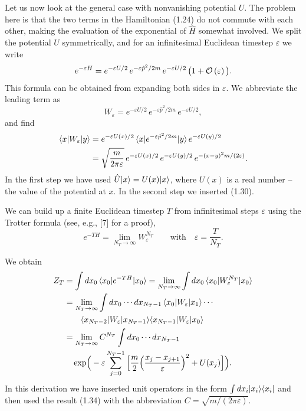 Let us now look at the general case with nonvanishing potential $U$. The
problem here is that the two terms in the Hamiltonian (1.24) do not commute
with each other, making the evaluation of the exponential of $\hat{H}$
somewhat involved. We split the potential $U$ symmetrically, and for an
infinitesimal Euclidean timestep $\varepsilon$ we write
\begin{equation}
  e^{-\varepsilon H} = e^{-\varepsilon U/2}\,e^{-\varepsilon\hat{p}^2/2m}\,
  e^{-\varepsilon U/2}\,\big(1 + \mathcal{O}\left(\varepsilon\right)\big).
\end{equation}
This formula can be obtained from expanding both sides in $\varepsilon$. We
abbreviate the leading term as
\begin{equation}
  W_\varepsilon = e^{-\varepsilon U/2}\,e^{-\varepsilon\hat{p}^2/2m}\,
  e^{-\varepsilon U/2},
\end{equation}
and find
\begin{equation}
  \begin{split}
    \langle x|W_\varepsilon|y\rangle
    &= e^{-\varepsilon U(x)/2}\,\langle x|e^{-\varepsilon\hat{p}^2/2m}|y\rangle\,
       e^{-\varepsilon U(y)/2}\\
    &= \sqrt{\frac{m}{2\pi\varepsilon}}\,
       e^{-\varepsilon U(x)/2}\,e^{-\varepsilon U(y)/2}\,e^{-(x-y)^2m/(2\varepsilon)}.
  \end{split}
\end{equation}
In the first step we have used $\hat{U}|x\rangle = U(x)|x\rangle$, where $U(x)$ is
a real number -- the value of the potential at $x$. In the second step we
inserted (1.30).

We can build up a finite Euclidean timestep $T$ from infinitesimal steps
$\varepsilon$ using the Trotter formula (see, e.g., [7] for a proof),
\begin{equation}
  e^{-TH} = \lim_{N_T\to\infty} W_\varepsilon^{N_T}
  \qquad \text{with} \quad \varepsilon = \frac{T}{N_T}.
\end{equation}

We obtain
\begin{align}
  Z_T &= \int dx_0\,\langle x_0|e^{-TH}|x_0\rangle
        = \lim_{N_T\to\infty}\int dx_0\,\langle x_0|W_\varepsilon^{N_T}|x_0\rangle \notag\\
      &= \lim_{N_T\to\infty}\int dx_0\cdots dx_{N_T-1}\,
         \langle x_0|W_\varepsilon|x_1\rangle\cdots \notag\\
      &\qquad \langle x_{N_T-2}|W_\varepsilon|x_{N_T-1}\rangle
         \langle x_{N_T-1}|W_\varepsilon|x_0\rangle \notag\\
      &= \lim_{N_T\to\infty} C^{N_T}\int dx_0\cdots dx_{N_T-1}\, \notag\\
      &\quad \exp\!\Big(-\varepsilon\sum_{j=0}^{N_T-1}
           \Big[\frac{m}{2}\Big(\frac{x_j - x_{j+1}}{\varepsilon}\Big)^2 + U(x_j)\Big]\Big).
\end{align}
In this derivation we have inserted unit operators in the form
$\int dx_i |x_i\rangle\langle x_i|$ and then used the result (1.34) with the
abbreviation $C = \sqrt{m/(2\pi\varepsilon)}$.

